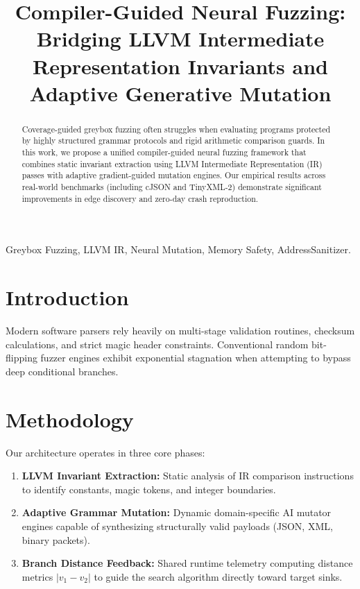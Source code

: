 \documentclass[conference]{IEEEtran}
\begin{document}
\title{Compiler-Guided Neural Fuzzing: Bridging LLVM Intermediate Representation Invariants and Adaptive Generative Mutation}

\author{
}

\maketitle

\begin{abstract}
Coverage-guided greybox fuzzing often struggles when evaluating programs protected by highly structured grammar protocols and rigid arithmetic comparison guards. In this work, we propose a unified compiler-guided neural fuzzing framework that combines static invariant extraction using LLVM Intermediate Representation (IR) passes with adaptive gradient-guided mutation engines. Our empirical results across real-world benchmarks (including cJSON and TinyXML-2) demonstrate significant improvements in edge discovery and zero-day crash reproduction.
\end{abstract}

\begin{IEEEkeywords}
Greybox Fuzzing, LLVM IR, Neural Mutation, Memory Safety, AddressSanitizer.
\end{IEEEkeywords}

\section{Introduction}
Modern software parsers rely heavily on multi-stage validation routines, checksum calculations, and strict magic header constraints. Conventional random bit-flipping fuzzer engines exhibit exponential stagnation when attempting to bypass deep conditional branches.

\section{Methodology}
Our architecture operates in three core phases:
\begin{enumerate}
    \item \textbf{LLVM Invariant Extraction:} Static analysis of IR comparison instructions to identify constants, magic tokens, and integer boundaries.
    \item \textbf{Adaptive Grammar Mutation:} Dynamic domain-specific AI mutator engines capable of synthesizing structurally valid payloads (JSON, XML, binary packets).
    \item \textbf{Branch Distance Feedback:} Shared runtime telemetry computing distance metrics $|v_1 - v_2|$ to guide the search algorithm directly toward target sinks.
\end{enumerate}
\end{document}
